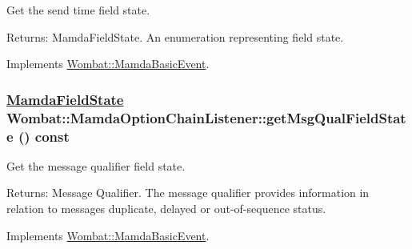 Get the send time field state. 

\begin{Desc}
\item[Returns:]Mamda\-Field\-State. An enumeration representing field state. \end{Desc}


Implements \hyperlink{classWombat_1_1MamdaBasicEvent_418ecb29b412cd42581b54c87b5360fd}{Wombat::Mamda\-Basic\-Event}.\hypertarget{classWombat_1_1MamdaOptionChainListener_55c3258edcbe570b4a68dd463b0f0f24}{
\subsubsection[getMsgQualFieldState]{\setlength{\rightskip}{0pt plus 5cm}\hyperlink{namespaceWombat_93aac974f2ab713554fd12a1fa3b7d2a}{Mamda\-Field\-State} Wombat::Mamda\-Option\-Chain\-Listener::get\-Msg\-Qual\-Field\-State () const}}
\label{classWombat_1_1MamdaOptionChainListener_55c3258edcbe570b4a68dd463b0f0f24}


Get the message qualifier field state. 

\begin{Desc}
\item[Returns:]Message Qualifier. The message qualifier provides information in relation to messages duplicate, delayed or out-of-sequence status. \end{Desc}


Implements \hyperlink{classWombat_1_1MamdaBasicEvent_3454d51e1131d9949691ee4b4153cd97}{Wombat::Mamda\-Basic\-Event}.